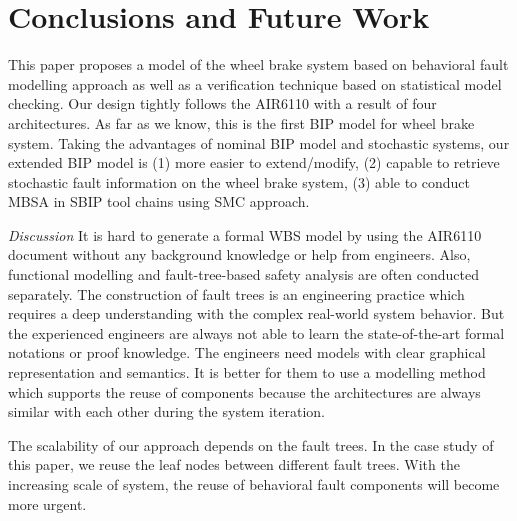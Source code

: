 \documentclass[runningheads]{llncs}
\begin{document}
\section{Conclusions and Future Work}
This paper proposes a model of the wheel brake system based on behavioral fault modelling approach as well as a verification technique based on statistical model checking. Our design tightly follows the AIR6110 with a result of four architectures. As far as we know, this is the first BIP model for wheel brake system. Taking the advantages of nominal BIP model and stochastic systems, our extended BIP model is (1) more easier to extend/modify, (2) capable to retrieve stochastic fault information on the wheel brake system, (3) able to conduct MBSA in SBIP tool chains using SMC approach.

\begin{comment}
The work of\cite{aadl14}\cite{aadl} focused on an extension of AADL Error Model called Annex, using WBS as an example. They find it hard to adding faults to existing components, and the integration process can obscure the nominal behaviors of the model. The paper\cite{cav15} proposes a formal modelling and analysis of WBS based on an integration of serveral approaches including OCRA, NuXmv and xSAP. They using a cluster of machines with massive memories and time, but also faces with time out problems during computation. However (1) our model is more easier to extend/modify due to the use of the component-based design approach, (2) the integrated model is more concrete due to the use of our behavioral fault modelling approach, (3) we are capable to retreive stochastic informations on the wheel brake system.
\end{comment}

\emph{Discussion} It is hard to generate a formal WBS model by using the AIR6110 document without any background knowledge or help from engineers. Also, functional modelling and fault-tree-based safety analysis are often conducted separately.  The construction of fault trees is an engineering practice which requires a deep understanding with the complex real-world system behavior. But the experienced engineers are always not able to learn the state-of-the-art formal notations or proof knowledge. The engineers need models with clear graphical representation and semantics. It is better for them to use a modelling method which supports the reuse of components because the architectures are always similar with each other during the system iteration.

The scalability of our approach depends on the fault trees. In the case study of this paper, we reuse the leaf nodes between different fault trees. With the increasing scale of system, the reuse of behavioral fault components will become more urgent.
\end{document}
